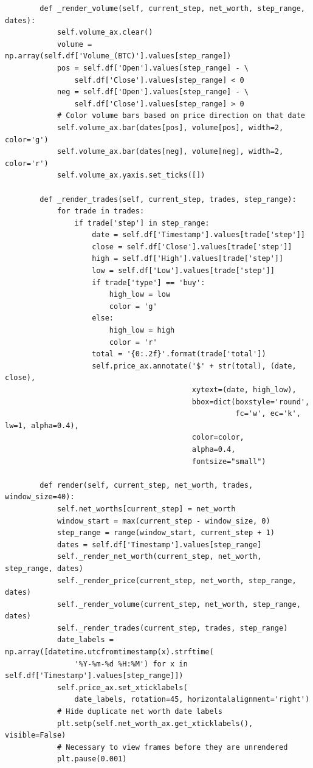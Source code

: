 \documentclass{article}
\begin{document}
\begin{lstlisting}
        def _render_volume(self, current_step, net_worth, step_range, dates):
            self.volume_ax.clear()
            volume = np.array(self.df['Volume_(BTC)'].values[step_range])
            pos = self.df['Open'].values[step_range] - \
                self.df['Close'].values[step_range] < 0
            neg = self.df['Open'].values[step_range] - \
                self.df['Close'].values[step_range] > 0
            # Color volume bars based on price direction on that date
            self.volume_ax.bar(dates[pos], volume[pos], width=2,  color='g')
            self.volume_ax.bar(dates[neg], volume[neg], width=2, color='r')
            self.volume_ax.yaxis.set_ticks([])
    
        def _render_trades(self, current_step, trades, step_range):
            for trade in trades:
                if trade['step'] in step_range:
                    date = self.df['Timestamp'].values[trade['step']]
                    close = self.df['Close'].values[trade['step']]
                    high = self.df['High'].values[trade['step']]
                    low = self.df['Low'].values[trade['step']]
                    if trade['type'] == 'buy':
                        high_low = low
                        color = 'g'
                    else:
                        high_low = high
                        color = 'r'
                    total = '{0:.2f}'.format(trade['total'])
                    self.price_ax.annotate('$' + str(total), (date, close),
                                           xytext=(date, high_low),
                                           bbox=dict(boxstyle='round',
                                                     fc='w', ec='k', lw=1, alpha=0.4),
                                           color=color,
                                           alpha=0.4,
                                           fontsize="small")
    
        def render(self, current_step, net_worth, trades, window_size=40):
            self.net_worths[current_step] = net_worth
            window_start = max(current_step - window_size, 0)
            step_range = range(window_start, current_step + 1)
            dates = self.df['Timestamp'].values[step_range]
            self._render_net_worth(current_step, net_worth, step_range, dates)
            self._render_price(current_step, net_worth, step_range, dates)
            self._render_volume(current_step, net_worth, step_range, dates)
            self._render_trades(current_step, trades, step_range)
            date_labels = np.array([datetime.utcfromtimestamp(x).strftime(
                '%Y-%m-%d %H:%M') for x in self.df['Timestamp'].values[step_range]])
            self.price_ax.set_xticklabels(
                date_labels, rotation=45, horizontalalignment='right')
            # Hide duplicate net worth date labels
            plt.setp(self.net_worth_ax.get_xticklabels(), visible=False)
            # Necessary to view frames before they are unrendered
            plt.pause(0.001)
    

\end{lstlisting}
\end{document}
